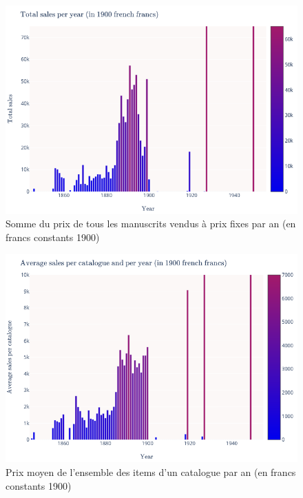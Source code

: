 \begin{figure}[p]
	\includegraphics[width=\textwidth]{annexes/fig_total_cat.png}
	\caption{Somme du prix de tous les manuscrits vendus à prix fixes par an (en francs constants 1900)}
	\label{appendix:totalcat}
\end{figure}

\begin{figure}[p]
	\includegraphics[width=\textwidth]{annexes/fig_avg_cat.png}
	\caption{Prix moyen de l'ensemble des items d'un catalogue par an (en francs constants 1900)}
	\label{appendix:avgcat}
\end{figure}

